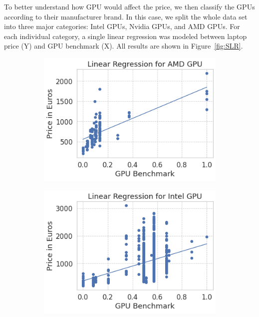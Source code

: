 \documentclass{scrartcl}
\begin{document}
To better understand how GPU would affect the price, we then classify the GPUs according to their manufacturer brand. In this case, we split the whole data set into three major categories: Intel GPUs, Nvidia GPUs, and AMD GPUs. For each individual category, a single linear regression was modeled between laptop price (Y) and GPU benchmark (X). All results are shown in Figure~\ref{fig:SLR}. 

\begin{figure}[H]
     \centering
     \begin{subfigure}
         \centering
         \includegraphics[scale=0.5]{Graphics/4520 final/AMD_GPU_LNR_0-1.png}
     \end{subfigure}
     \hfill
     \begin{subfigure}
         \centering
         \includegraphics[scale=0.5]{Graphics/4520 final/Intel_GPU_LNR_0-1.png}
     \end{subfigure}
     \hfill
     \begin{subfigure}
         \centering

\end{subfigure}
\end{figure}
\end{document}
